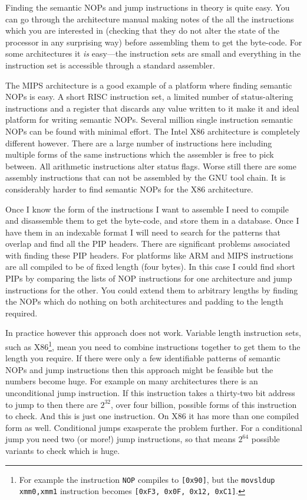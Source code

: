 \documentclass[10pt]{book}
\begin{document}
Finding the semantic NOPs and jump instructions in theory is quite easy.
You can go through the architecture manual making notes of the all the
instructions which you are interested in (checking that they do not
alter the state of the processor in any surprising way) before
assembling them to get the byte-code. For some architectures it
\emph{is} easy---the instruction sets are small and everything in the
instruction set is accessible through a standard assembler.

The MIPS architecture\autocite{MIPSTechnologiesInc:2011ta} is a good
example of a platform where finding semantic NOPs is easy. A short RISC
instruction set, a limited number of status-altering instructions and a
register that discards any value written to it make it and ideal
platform for writing semantic NOPs. Several million single instruction
semantic NOPs can be found with minimal effort. The Intel X86
architecture\autocite{IntelCorporation:1997ta} is completely different
however. There are a large number of instructions here including
multiple forms of the same instructions which the assembler is free to
pick between. All arithmetic instructions alter status flags. Worse
still there are some assembly instructions that can not be assembled by
the GNU tool chain\autocite{Anonymous:td}. It is considerably harder to
find semantic NOPs for the X86 architecture.

Once I know the form of the instructions I want to assemble I need to
compile and disassemble them to get the byte-code, and store them in a
database. Once I have them in an indexable format I will need to search
for the patterns that overlap and find all the PIP headers. There are
significant problems associated with finding these PIP headers. For
platforms like ARM\autocite{Seal:2000vd} and
MIPS\autocite{MIPSTechnologiesInc:2011ta} instructions are all compiled
to be of fixed length (four bytes). In this case I could find short PIPs
by comparing the lists of NOP instructions for one architecture and jump
instructions for the other. You could extend them to arbitrary lengths
by finding the NOPs which do nothing on both architectures and padding
to the length required.

In practice however this approach does not work. Variable length
instruction sets, such as X86\footnote{For example the instruction
  \lstinline!NOP! compiles to \lstinline![0x90]!, but the
  \lstinline!movsldup xmm0,xmm1! instruction becomes
  \lstinline![0xF3, 0x0F, 0x12, 0xC1]!.}, mean you need to combine
instructions together to get them to the length you require. If there
were only a few identifiable patterns of semantic NOPs and jump
instructions then this approach might be feasible but the numbers become
huge. For example on many architectures there is an unconditional jump
instruction. If this instruction takes a thirty-two bit address to jump
to then there are $2^{32}$, over four billion, possible forms of this
instruction to check. And this is just one instruction. On X86 it has
more than one compiled form as well. Conditional jumps exasperate the
problem further. For a conditional jump you need two (or more!) jump
instructions, so that means $2^{64}$ possible variants to check which is
huge.
\end{document}
